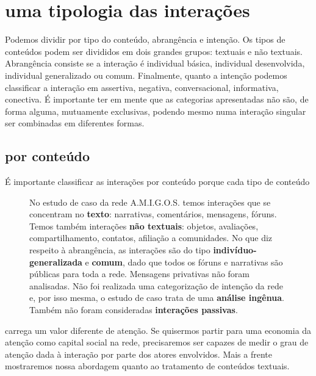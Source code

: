 \documentclass{article}
\begin{document}
\section{uma tipologia das interações}

Podemos dividir por tipo do conteúdo, abrangência e intenção. Os tipos de
conteúdos podem ser divididos em dois grandes grupos: textuais e não textuais.
Abrangência consiste se a interação é individual básica, individual
desenvolvida, individual generalizado ou comum. Finalmente, quanto a intenção
podemos classificar a interação em assertiva, negativa, conversacional,
informativa, conectiva. É importante ter em mente que as categorias
apresentadas não são, de forma alguma, mutuamente exclusivas, podendo mesmo numa
interação singular ser combinadas em diferentes formas.
\subsection{por conteúdo}
É importante classificar as interações por conteúdo porque cada tipo de conteúdo\begin{figure}
\begin{boxedminipage}{2in}
No estudo de caso da rede A.M.I.G.O.S. temos interações que se concentram no
\textbf{texto}: narrativas, comentários, mensagens, fóruns. Temos também
interações \textbf{não textuais}: objetos, avaliações, compartilhamento,
contatos, afiliação a comunidades. No que diz respeito à abrangência, as
interações são do tipo \textbf{indivíduo-generalizada} e \textbf{comum}, dado
que todos os fóruns e narrativas são públicas para toda a rede. Mensagens
privativas não foram analisadas. Não foi realizada uma categorização de
intenção da rede e, por isso mesma, o estudo de caso trata de uma
\textbf{análise ingênua}. Também não foram consideradas \textbf{interações
passivas}.
\end{boxedminipage}
\end{figure}carrega um valor diferente de atenção. Se quisermos partir para
uma economia da atenção como capital social na rede, precisaremos ser capazes
de medir o grau de atenção dada à interação por parte dos atores envolvidos.
Mais a frente mostraremos nossa abordagem quanto ao tratamento de conteúdos
textuais.
\end{document}
